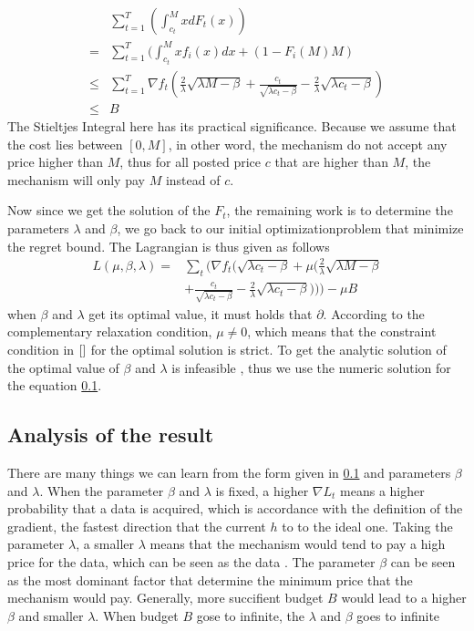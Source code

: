 \documentclass[10pt,conference,compsocconf,letterpaper]{IEEEtran}
\begin{document}
\begin{equation*}
\begin{aligned}
&\sum_{t=1}^T(\int_{c_t}^MxdF_t(x))\\
=&\sum_{t=1}^T(\int_{c_t}^Mxf_i(x)dx+(1-F_i(M)M)\\
\leq &\sum_{t=1}^T\nabla f_t (\frac{2}{\lambda}\sqrt{\lambda M-\beta}+\frac{c_t}{\sqrt{\lambda c_t-\beta}}-\frac{2}{\lambda}\sqrt{\lambda c_t-\beta})\\
\leq &B
\end{aligned}
\end{equation*}
The Stieltjes Integral here has its practical significance. Because we assume that the cost lies between $[0,M]$, in other word, the mechanism do not accept any price higher than $M$, thus for all posted price $c$ that are higher than $M$, the mechanism will only pay $M$ instead of $c$.


Now since we get the solution of the $F_t$, the remaining work is to determine the parameters $\lambda$ and $\beta$, we go back to our initial optimizationproblem that minimize the regret bound. The Lagrangian is thus given as follows
\begin{equation}
\begin{aligned}
L(\mu,\beta,\lambda)=&\sum_t \bigg( \nabla f_t\Big( \sqrt{\lambda c_t-\beta}+\mu \big(\frac{2}{\lambda}\sqrt{\lambda M-\beta}\\
&+\frac{c_t}{\sqrt{\lambda c_t-\beta}}-\frac{2}{\lambda}\sqrt{\lambda c_t-\beta}\big)\Big)\bigg)-\mu B
\end{aligned}
\end{equation}
when $\beta$ and $\lambda$ get its optimal value, it must holds that $\partial$.
According to the complementary relaxation condition, $\mu\neq 0$, which means that the constraint condition in $\ref{}$ for the optimal solution is strict. 
To get the analytic solution of the optimal value of $\beta$ and $\lambda$ is infeasible , thus we use the numeric solution for the equation \ref{}.

\subsection{Analysis of the result}
There are many things we can learn from the form given in \ref{} and parameters $\beta$ and $\lambda$. When the parameter $\beta$ and $\lambda$ is fixed, a higher $\nabla L_t$ means a higher probability that a data is acquired, which is accordance with the definition of the gradient, the fastest direction that the current $h$ to to the ideal one. Taking the parameter $\lambda$, a smaller $\lambda$ means that the mechanism would tend to pay a high price for the data, which can be seen as the data . The parameter $\beta$ can be seen as the most dominant factor that determine the minimum price that the mechanism would pay. Generally, more succifient budget $B$ would lead to a higher $\beta$ and smaller $\lambda$. When budget $B$ gose to infinite, the $\lambda$ and $\beta$ goes to infinite
\end{document}
